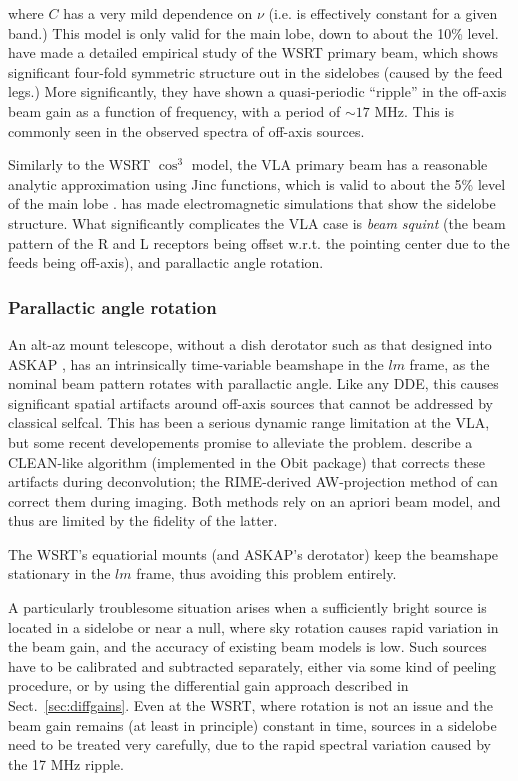 \documentclass[]{aa}
\begin{document}
where $C$ has a very mild dependence on $\nu$ (i.e. is effectively constant for a given band.) This model is only valid for the main lobe, down to about the 10\% level. \citet{Popping-Braun:WSRT-beam} have made a detailed empirical study of the WSRT primary beam, which shows significant four-fold symmetric structure out in the sidelobes (caused by the feed legs.) More significantly, they have shown a quasi-periodic ``ripple'' in the off-axis beam gain as a function of frequency, with a period of $\sim17$ MHz. This is commonly seen in the observed spectra of off-axis sources.

Similarly to the WSRT $\cos^3$ model, the VLA primary beam has a reasonable analytic approximation using Jinc functions, which is valid to about the 5\% level of the main lobe \citep{Uson-Cotton:VLA-beam}. \citet{Brisken:VLA-beam} has made electromagnetic simulations that show the sidelobe structure. What significantly complicates the VLA case is {\em beam squint} (the beam pattern of the R and L receptors being offset w.r.t. the pointing center due to the feeds being off-axis), and parallactic angle rotation.

\subsubsection{Parallactic angle rotation}

An alt-az mount telescope, without a dish derotator such as that designed into ASKAP \citep{ASKAP}, has an intrinsically time-variable beamshape in the $lm$ frame, as the nominal beam pattern rotates with parallactic angle. Like any DDE, this causes significant spatial artifacts around off-axis sources that cannot be addressed by classical selfcal. This has been a serious dynamic range limitation at the VLA, but some recent developements promise to alleviate the problem. \citet{Uson-Cotton:VLA-beam} describe a CLEAN-like algorithm (implemented in the Obit package) that corrects these artifacts during deconvolution; the RIME-derived AW-projection method of \citet{SB:imageplane} can correct them during imaging. Both methods rely on an apriori beam model, and thus are limited by the fidelity of the latter.

The WSRT's equatiorial mounts (and ASKAP's derotator) keep the beamshape stationary in the $lm$ frame, thus avoiding this problem entirely.

A particularly troublesome situation arises when a sufficiently bright source is located in a sidelobe or near a null, where sky rotation causes rapid variation in the beam gain, and the accuracy of existing beam models is low. Such sources have to be calibrated and subtracted separately, either via some kind of peeling procedure, or by using the differential gain approach described in Sect.~\ref{sec:diffgains}. Even at the WSRT, where rotation is not an issue and the beam gain remains (at least in principle) constant in time, sources in a sidelobe need to be treated very carefully, due to the rapid spectral variation caused by the 17 MHz ripple.
\end{document}
